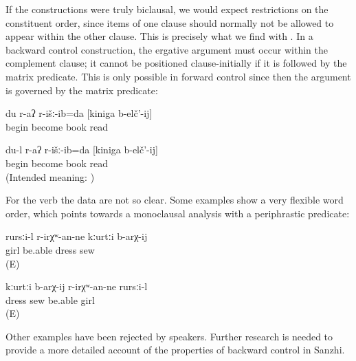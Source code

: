 If the constructions were truly biclausal, we would expect restrictions on the constituent order, since items of one clause should normally not be allowed to appear within the other clause. This is precisely what we find with . In a backward control construction, the ergative argument must occur within the complement clause; it cannot be positioned clause-initially if it is followed by the matrix predicate. This is only possible in forward control since then the argument is governed by the matrix predicate:
%
\begin{exe}
	\ex	\label{ex:‎I began to read the book}
	\gll	du	r-aʔ	r-išː-ib=da	[kiniga	b-elč'-ij]\\
			\tsc{f-}begin	become	book	read\\
	\glt	{}

	\ex	\label{ex:I began to read the book ungrammatical}
	\gll	{*} 	du-l	r-aʔ	r-išː-ib=da	[kiniga	b-elč'-ij]\\
		{}		\tsc{f-}begin	become	book	read\\
	\glt	‎ (Intended meaning: )
\end{exe}

For the verb  the data are not so clear. Some examples show a very flexible word order, which points towards a monoclausal analysis with a periphrastic predicate:
%
\begin{exe}
	\ex
	\gll	rursːi-l	r-irχʷ-an-ne kːurtːi	b-arχ-ij \\
		girl	be.able	dress	sew\\
	\glt	{} (E)

	\ex
	\gll	kːurtːi	b-arχ-ij	r-irχʷ-an-ne	rursːi-l\\
		dress	sew	be.able	girl\\
	\glt	{} (E)
\end{exe}

Other examples have been rejected by speakers. Further research is needed to provide a more detailed account of the properties of backward control in Sanzhi.



